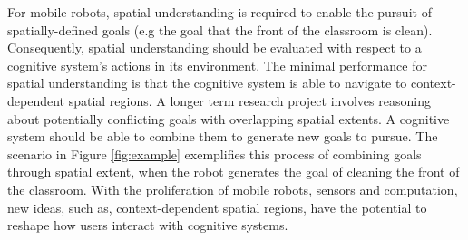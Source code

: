 \documentclass[letterpaper]{article}
\begin{document}
For mobile robots, spatial understanding is required to enable the pursuit of spatially-defined goals (e.g the goal that the front of the classroom is clean). Consequently, spatial understanding should be evaluated with respect to a cognitive system's actions in its environment. The minimal performance for spatial understanding is that the cognitive system is able to navigate to context-dependent spatial regions. A longer term research project involves reasoning about potentially conflicting goals with overlapping spatial extents. A cognitive system should be able to combine them to generate new goals to pursue. The scenario in Figure \ref{fig:example} exemplifies this process of combining goals through spatial extent, when the robot generates the goal of cleaning the front of the classroom. With the proliferation of mobile robots, sensors and computation, new ideas, such as, context-dependent spatial regions, have the potential to reshape how users interact with cognitive systems.

% 

\newpage



\end{document}
